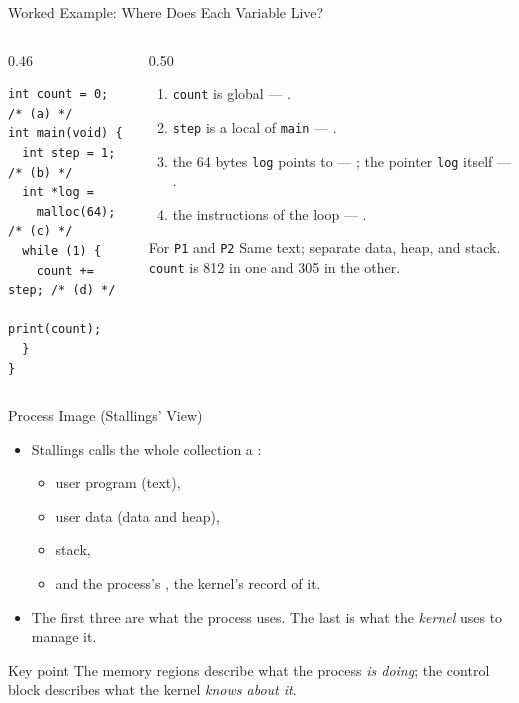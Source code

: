 \documentclass[aspectratio=169]{beamer}
\begin{document}
\begin{frame}[fragile]{Worked Example: Where Does Each Variable Live?}
  \small
  \begin{columns}[T]
    \begin{column}{0.46\textwidth}
\begin{verbatim}
int count = 0;  /* (a) */
int main(void) {
  int step = 1;  /* (b) */
  int *log =
    malloc(64);  /* (c) */
  while (1) {
    count += step; /* (d) */
    print(count);
  }
}
\end{verbatim}
    \end{column}
    \begin{column}{0.50\textwidth}
      \begin{enumerate}
        \item[(a)] \texttt{count} is global --- .
        \item[(b)] \texttt{step} is a local of \texttt{main} --- .
        \item[(c)] the 64 bytes \texttt{log} points to --- ;
          the pointer \texttt{log} itself --- .
        \item[(d)] the instructions of the loop --- .
      \end{enumerate}
      \vspace{0.1cm}
      \begin{exampleblock}{For \texttt{P1} and \texttt{P2}}
        Same text; separate data, heap, and stack. \texttt{count} is 812 in
        one and 305 in the other.
      \end{exampleblock}
    \end{column}
  \end{columns}
\end{frame}

\begin{frame}{Process Image (Stallings' View)}
  \begin{itemize}
    \item Stallings calls the whole collection a :
    \begin{itemize}
      \item user program (text),
      \item user data (data and heap),
      \item stack,
      \item and the process's , the kernel's record of it.
    \end{itemize}
    \item The first three are what the process uses. The last is what the
      \emph{kernel} uses to manage it.
  \end{itemize}
  \vspace{0.2cm}
  \begin{block}{Key point}
    The memory regions describe what the process \emph{is doing}; the control
    block describes what the kernel \emph{knows about it}.
  \end{block}
\end{frame}
\end{document}

